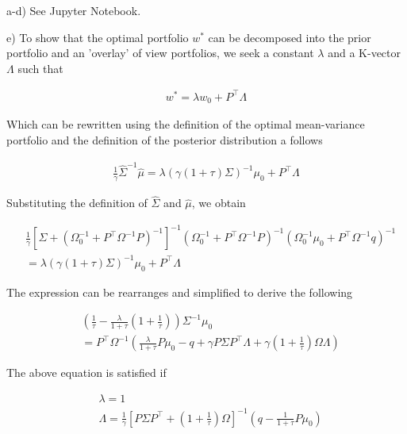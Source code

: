 \documentclass[10pt]{article}
\newenvironment{exercise}[2][Exercise]{\begin{trivlist}
  \item[\hskip \labelsep {\bfseries #1}\hskip \labelsep {\bfseries #2.}]}{\end{trivlist}}
\begin{document}
\newpage

\begin{exercise}{2}
\end{exercise}

a-d) See Jupyter Notebook.

\bigbreak

e) To show that the optimal portfolio $w^*$ can be decomposed into the prior portfolio and an 'overlay' of view portfolios, we seek a constant $\lambda$ and a K-vector $\Lambda$ such that 

\begin{align*}
	w^* = \lambda w_0 + P^\top \Lambda
\end{align*}

Which can be rewritten using the definition of the optimal mean-variance portfolio and the definition of the posterior distribution a follows

\begin{align*}
	\frac{1}{\gamma} \hat{\Sigma}^{-1}\hat{\mu} = \lambda (\gamma (1 + \tau) \Sigma)^{-1} \mu_0 + P^\top \Lambda
\end{align*}

Substituting the definition of $\hat{\Sigma}$ and $\hat{\mu}$, we obtain

\begin{align*}
	&\frac{1}{\gamma} \left[ \Sigma + \left( \Omega_0^{-1} + P^\top \Omega^{-1}P \right)^{-1} \right]^{-1} \left( \Omega_0^{-1} + P^\top \Omega^{-1} P \right)^{-1} \left( \Omega_0^{-1}\mu_0 + P^\top \Omega^{-1} q \right)^{-1} \\
	& = \lambda(\gamma ( 1 + \tau) \Sigma)^{-1} \mu_0 + P^\top \Lambda
\end{align*}

The expression can be rearranges and simplified to derive the following

\begin{align*}
	&\left( \frac{1}{\tau} - \frac{\lambda}{1+\tau} \left( 1 + \frac{1}{\tau} \right) \right) \Sigma^{-1} \mu_0 \\
	&= P^\top \Omega^{-1} \left( \frac{\lambda}{1 + \tau} P \mu_0 - q + \gamma P \Sigma P^\top \Lambda + \gamma \left( 1 + \frac{1}{\tau} \right)  \Omega \Lambda \right)
\end{align*}

The above equation is satisfied if 

\begin{align*}
	&\lambda = 1\\
	&\Lambda = \frac{1}{\gamma} \left[ P\Sigma P^\top  + \left( 1 + \frac{1}{\tau} \right) \Omega \right]^{-1} \left( q - \frac{1}{1+\tau} P \mu_0 \right)
\end{align*}
\end{document}
